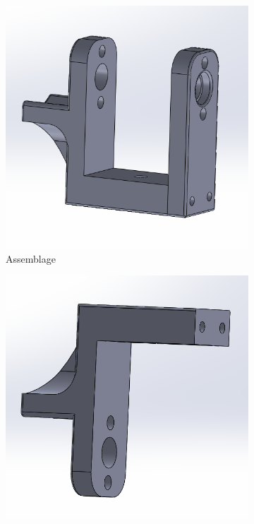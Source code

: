 \begin{figure}[h!]
    \begin{subfigure}{0.35\linewidth}
        \centering
        \includegraphics[width=\linewidth]{img/s2/cad/motorholer}
        \caption{Assemblage}
        \label{fig:s2-cad-motorholer}
    \end{subfigure}
    \begin{subfigure}{0.35\linewidth}
        \centering
        \includegraphics[width=\linewidth]{img/s2/cad/supportmoteur1}

\end{subfigure}
\end{figure}
